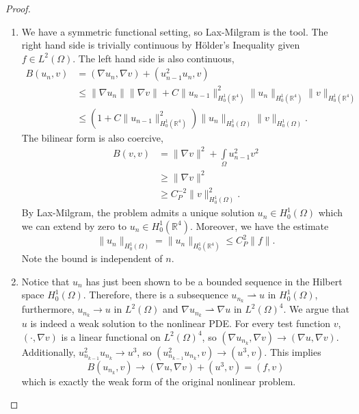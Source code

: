 \documentclass[letterpaper,twoside,11pt]{article}
\theoremstyle{mystyle}
\newcommand{\R}{{\mathbb R}}
\newcommand{\cbk}{\color{black}}
\newcommand{\cred}{\color{red}}
\begin{document}
\begin{proof}
\begin{enumerate}
    \item We have a symmetric functional setting, so Lax-Milgram is the tool. The right hand side is trivially continuous by H\"older's Inequality given $f \in L^2 (\Omega)$. The left hand side is also continuous, 
    \begin{align*}
      B(u_n,v) &= \left( \nabla u_n, \nabla v \right) + \left( u_{n-1}^2 u_n ,v \right)\\
      &\leq \|\nabla u_n\| \|\nabla v\| + C\|u_{n-1}\|^2_{H_0^1(\R^4)} \|u_n \|_{H_0^1(\R^4)} \|v\|_{H_0^1(\R^4)} \\
      &\leq \left( 1+C\|u_{n-1}\|^2_{H_0^1(\R^4)} \right)\|u_n \|_{H_0^1(\Omega)} \|v\|_{H_0^1(\Omega)}.
    \end{align*}
    The bilinear form is also coercive, 
    \begin{align*}
      B\left( v, v \right) &= \|\nabla v\|^2 + \int\limits_\Omega u_{n-1}^2 v^2 \\ 
      &\geq \|\nabla v\|^2 \\
      &\geq C_P^{-2} \|v\|_{H^1_0(\Omega)}^2.
    \end{align*}
    By Lax-Milgram, the problem admits a unique solution $u_n \in H_0^1 \left( \Omega \right)$ which we can extend by zero to $u_n \in H_0^1 \left( \R^4 \right)$. Moreover, we have the estimate 
    \[\|u_n\|_{H^1_0 \left( \Omega \right)} = \|u_n\|_{H^1_0 \left( \R^4 \right)} \leq C_P^2 \|f\|.\] Note the bound is independent of $n$. 
    \item \cred Notice that $u_n$ has just been shown to be a bounded sequence in the Hilbert space $H_0^1 \left( \Omega \right)$. Therefore, there is a subsequence $u_{n_k} \rightharpoonup u$ in $H_0^1(\Omega)$, furthermore, $u_{n_k} \to u$ in $L^2 (\Omega)$ and $\nabla u_{n_k} \rightharpoonup \nabla u$ in $L^2 (\Omega)^{4}$. 
    We argue that $u$ is indeed a weak solution to the nonlinear PDE. For every test function $v$, $\left( \cdot, \nabla v \right)$ is a linear functional on $L^2(\Omega)^4$, so $\left( \nabla u_{n_k}, \nabla v \right) \to \left( \nabla u, \nabla v \right)$. Additionally, $u_{n_{k-1}}^2 u_{n_k} \to u^3$, so $\left( u_{n_{k-1}}^2 u_{n_k} ,v \right) \to \left( u^3, v \right)$. This implies 
    \[B(u_{n_k}, v) \to \left( \nabla u, \nabla v \right) + \left( u^3, v \right) = \left( f, v \right)\]
    which is exactly the weak form of the original nonlinear problem. 
  \end{enumerate}
\end{proof}
\cbk 
\end{document}
